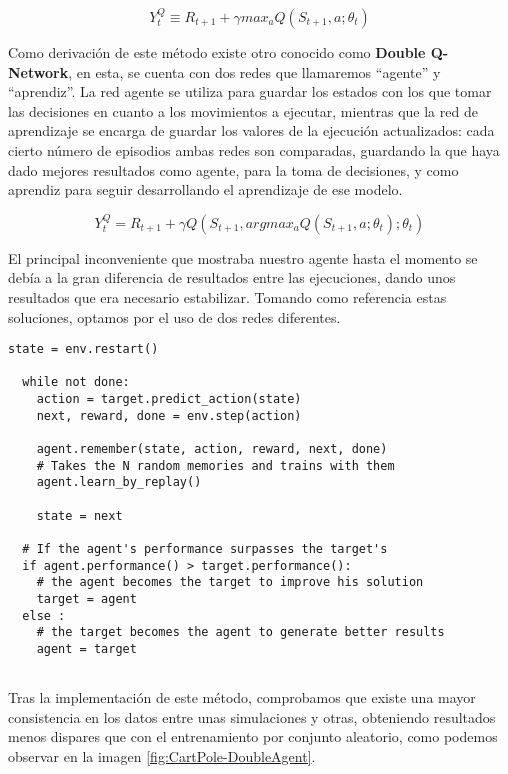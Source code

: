 $$Y^Q_{t} \equiv R_{t+1} + \gamma max_{a} Q(S_{t+1}, a; \theta_{t})$$

Como derivación de este método existe otro conocido como \textbf{Double Q-Network}, en esta, se cuenta con dos redes que llamaremos ``agente'' y ``aprendiz''. La red agente se utiliza para guardar los estados con los que tomar las decisiones en cuanto a los movimientos a ejecutar, mientras que la red de aprendizaje se encarga de guardar los valores de la ejecución actualizados: cada cierto número de episodios ambas redes son comparadas, guardando la que haya dado mejores resultados como agente, para la toma de decisiones, y como aprendiz para seguir desarrollando el aprendizaje de ese modelo.

$$Y^Q_{t} = R_{t+1} + \gamma Q(S_{t+1}, argmax_{a} Q(S_{t+1}, a; \theta_{t}); \theta_{t})$$

El principal inconveniente que mostraba nuestro agente hasta el momento se debía a la gran diferencia de resultados entre las ejecuciones, dando unos resultados que era necesario estabilizar. Tomando como referencia estas soluciones, optamos por el uso de dos redes diferentes.

\begin{minipage}{0.9\linewidth}%
\begin{lstlisting}[frame=tb, caption=Pseudocódigo DoubleAgent, inputencoding=latin1, label=code:cartpole_drl4]
  state = env.restart()

  while not done:
    action = target.predict_action(state)
    next, reward, done = env.step(action)

    agent.remember(state, action, reward, next, done)
    # Takes the N random memories and trains with them
    agent.learn_by_replay()

    state = next

  # If the agent's performance surpasses the target's
  if agent.performance() > target.performance():
    # the agent becomes the target to improve his solution
    target = agent
  else :
    # the target becomes the agent to generate better results
    agent = target
        
\end{lstlisting}%
\end{minipage}

Tras la implementación de este método, comprobamos que existe una mayor consistencia en los datos entre unas simulaciones y otras, obteniendo resultados menos dispares que con el entrenamiento por conjunto aleatorio, como podemos observar en la imagen \ref{fig:CartPole-DoubleAgent}.

